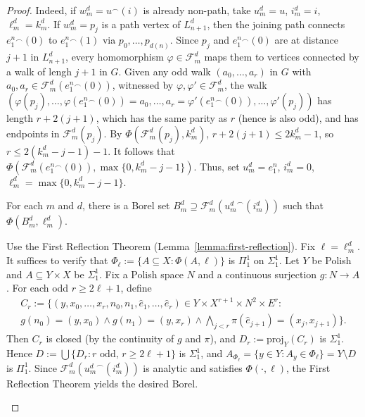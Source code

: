 \documentclass[12pt]{article}
\begin{document}
\begin{proof}
    Indeed, if $w^d_m=u^\smallfrown(i)$ is already non-path, take $u^d_m=u$, $i^d_m=i$, $\ell^d_m=k^d_m$.
    If $w^d_m=p_j$ is a path vertex of $L^d_{n+1}$, then the joining path connects $e_1^n{}^\smallfrown(0)$ to $e_1^n{}^\smallfrown(1)$ via $p_0,\dots,p_{d(n)}$.
    Since $p_j$ and $e_1^n{}^\smallfrown(0)$ are at distance $j+1$ in $L^d_{n+1}$, every homomorphism $\varphi\in\mathcal F^d_m$ maps them to vertices connected by a walk of lengh $j+1$ in $G$.
    Given any odd walk $(a_0,\dots,a_r)$ in $G$ with $a_0,a_r\in\mathcal F^d_m(e_1^n{}^\smallfrown(0))$, witnessed by $\varphi,\varphi'\in\mathcal F^d_m$, the walk $(\varphi(p_j),\dots,\varphi(e_1^n{}^\smallfrown(0))=a_0,\dots,a_r=\varphi'(e_1^n{}^\smallfrown(0)),\dots,\varphi'(p_j))$ has length $r+2(j+1)$, which has the same parity as $r$ (hence is also odd), and has endpoints in $\mathcal F^d_m(p_j)$.
    By $\Phi(\mathcal F^d_m(p_j),k^d_m)$, $r+2(j+1)\leq 2k^d_m-1$, so $r\leq 2(k^d_m-j-1)-1$.
    It follows that $\Phi(\mathcal F^d_m(e_1^n{}^\smallfrown(0)),\max\{0,k^d_m-j-1\})$.
    Thus, set $u^d_m=e_1^n$, $i^d_m=0$, $\ell^d_m=\max\{0,k^d_m-j-1\}$.
    
    \begin{claim}
        For each $m$ and $d$, there is a Borel set $B^d_m\supseteq\mathcal F^d_m({u^d_m}^\smallfrown(i^d_m))$ such that $\Phi(B^d_m,\ell^d_m)$.
    \end{claim}

    \begin{claimproof}
        Use the First Reflection Theorem (Lemma~\ref{lemma:first-reflection}).
        Fix $\ell=\ell^d_m$.
        It suffices to verify that $\Phi_\ell:=\{A\subseteq X:\Phi(A,\ell)\}$ is $\Pi^1_1$ on $\Sigma^1_1$.
        Let $Y$ be Polish and $A\subseteq Y\times X$ be $\Sigma^1_1$.
        Fix a Polish space $N$ and a continuous surjection $g\colon N\to A$.
        For each odd $r\geq 2\ell+1$, define
        \begin{align*}
            C_r:=\{(y,x_0,\dots,x_r,n_0,n_1,\hat e_1,\dots,\hat e_r)\in Y\times X^{r+1}\times N^2\times E^r:{}\\
            g(n_0)=(y,x_0)\land g(n_1)=(y,x_r)\land\textstyle\bigwedge_{j<r}\pi(\hat e_{j+1})=(x_j,x_{j+1})\}.
        \end{align*}
        Then $C_r$ is closed (by the continuity of $g$ and $\pi$), and $D_r:=\mathrm{proj}_Y(C_r)$ is $\Sigma^1_1$.
        Hence $D:=\bigcup\{D_r:r\text{ odd},\,r\geq 2\ell+1\}$ is $\Sigma^1_1$, and $A_{\Phi_\ell}=\{y\in Y:A_y\in\Phi_\ell\}=Y\setminus D$
        is $\Pi^1_1$.
        Since $\mathcal F^d_m({u^d_m}^\smallfrown(i^d_m))$ is analytic and satisfies $\Phi(\cdot,\ell)$, the First Reflection Theorem yields the desired Borel.
    \end{claimproof}


\end{proof}
\end{document}
